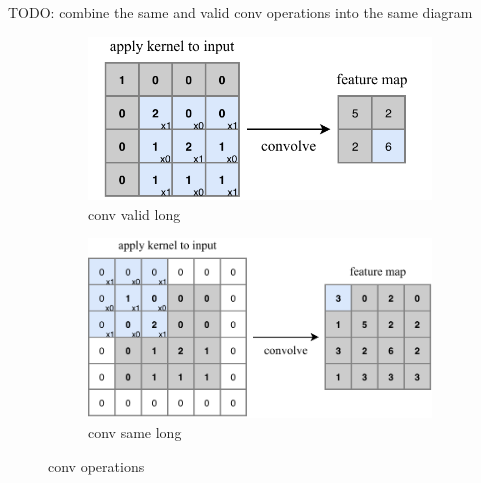 TODO: combine the same and valid conv operations into the same diagram
\begin{figure} %
    \centering
    \begin{subfigure}[b]{0.71\textwidth}
        \centering
        \includegraphics[width=\textwidth]{diagrams/6-cvn/conv_valid.pdf}
        \caption{conv valid long}
        \label{fig:conv_valid}
    \end{subfigure}
    \hfill
    \begin{subfigure}[b]{0.9\textwidth}
        \centering
        \includegraphics[width=\textwidth]{diagrams/6-cvn/conv_same.pdf}
        \caption{conv same long}
        \label{fig:conv_same}
    \end{subfigure}
    \caption{conv operations}
    \label{fig:conv_operations}
\end{figure} %


